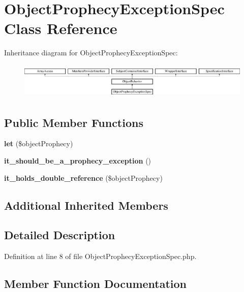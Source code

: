 \section{Object\+Prophecy\+Exception\+Spec Class Reference}
\label{classspec_1_1_prophecy_1_1_exception_1_1_prophecy_1_1_object_prophecy_exception_spec}
Inheritance diagram for Object\+Prophecy\+Exception\+Spec\+:\begin{figure}[H]
\begin{center}
\leavevmode
\includegraphics[height=1.714286cm]{classspec_1_1_prophecy_1_1_exception_1_1_prophecy_1_1_object_prophecy_exception_spec}
\end{center}
\end{figure}
\subsection*{Public Member Functions}
\begin{DoxyCompactItemize}
\item 
{\bf let} (\$object\+Prophecy)
\item 
{\bf it\+\_\+should\+\_\+be\+\_\+a\+\_\+prophecy\+\_\+exception} ()
\item 
{\bf it\+\_\+holds\+\_\+double\+\_\+reference} (\$object\+Prophecy)
\end{DoxyCompactItemize}
\subsection*{Additional Inherited Members}


\subsection{Detailed Description}


Definition at line 8 of file Object\+Prophecy\+Exception\+Spec.\+php.



\subsection{Member Function Documentation}
